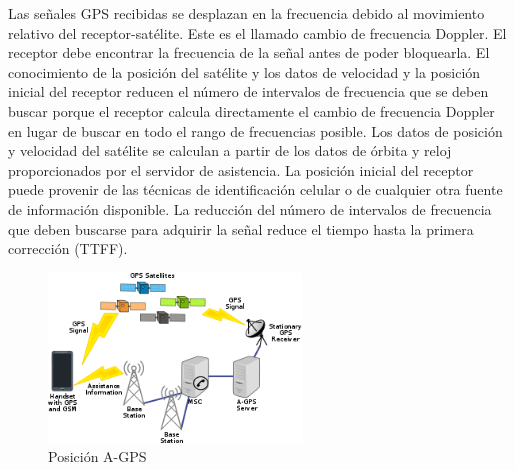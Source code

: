 Las señales GPS recibidas se desplazan en la frecuencia debido al movimiento relativo del receptor-satélite. Este es el llamado cambio de frecuencia Doppler. El receptor debe encontrar la frecuencia de la señal antes de poder bloquearla. El conocimiento de la posición del satélite y los datos de velocidad y la posición inicial del receptor reducen el número de intervalos de frecuencia que se deben buscar porque el receptor calcula directamente el cambio de frecuencia Doppler en lugar de buscar en todo el rango de frecuencias posible. Los datos de posición y velocidad del satélite se calculan a partir de los datos de órbita y reloj proporcionados por el servidor de asistencia. La posición inicial del receptor puede provenir de las técnicas de identificación celular o de cualquier otra fuente de información disponible. La reducción del número de intervalos de frecuencia que deben buscarse para adquirir la señal reduce el tiempo hasta la primera corrección (TTFF).

\begin{figure}[htbp!]
	\begin{center}
		\includegraphics[width=0.6\textwidth]{MarcoTeorico/imagenes/AGPS}
		\caption{Posición A-GPS}
		\label{MT/SS/AGPS}
	\end{center}
\end{figure}





